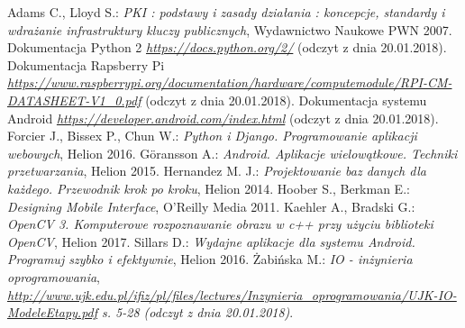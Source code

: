 \newpage
   \begin{thebibliography}{99}
    	Adams C., Lloyd S.: 
    	\textit{PKI : podstawy i zasady działania : koncepcje, standardy i wdrażanie infrastruktury kluczy publicznych}, Wydawnictwo Naukowe PWN 2007.
    	Dokumentacja Python 2
    	\textit{ \href  {https://docs.python.org/2/}{https://docs.python.org/2/} }(odczyt z dnia 20.01.2018).
    	Dokumentacja Rapsberry Pi \\
    	\textit{ \href {https://www.raspberrypi.org/documentation/hardware/computemodule/RPI-CM-DATASHEET-V1_0.pdf} {https://www.raspberrypi.org/documentation/hardware/computemodule/RPI-CM-DATASHEET-V1\_0.pdf} }(odczyt z dnia 20.01.2018). 
    	Dokumentacja systemu Android
    	\textit{ \href {https://developer.android.com/index.html} {https://developer.android.com/index.html} }(odczyt z dnia 20.01.2018). 
    	Forcier J., Bissex P., Chun W.:
    	\textit{Python i Django. Programowanie aplikacji webowych}, 
    	Helion 2016.
    	Göransson A.: 
    	\textit{Android. Aplikacje wielowątkowe. Techniki przetwarzania}, 
    	Helion 2015. 
    	Hernandez M. J.: 
    	\textit{Projektowanie baz danych dla każdego. Przewodnik krok po kroku}, 
    	Helion 2014.
    	Hoober S., Berkman E.: 
    	\textit{Designing Mobile Interface}, 
    	 O'Reilly Media 2011.
    	 Kaehler A., Bradski G.: 
    	 \textit{OpenCV 3. Komputerowe rozpoznawanie obrazu w c++ przy użyciu biblioteki OpenCV}, Helion 2017.
    	 Sillars D.:
    	 \textit{Wydajne aplikacje dla systemu Android. Programuj szybko i efektywnie}, 
    	 Helion 2016.
    	 Żabińska M.: \textit{IO - inżynieria oprogramowania},\\
    	 \textit{\href{http://www.ujk.edu.pl/ifiz/pl/files/lectures/Inzynieria\_oprogramowania/UJK-IO-ModeleEtapy.pdf}{http://www.ujk.edu.pl/ifiz/pl/files/lectures/Inzynieria\_oprogramowania/UJK-IO-ModeleEtapy.pdf} s. 5-28 (odczyt z dnia 20.01.2018)}.
     \end{thebibliography}
 
